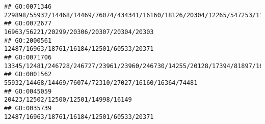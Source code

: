 \documentclass[
]{article}
\begin{document}
\begin{verbatim}
## GO:0071346                                                                                                                                                                                                                                                                                                                      229898/55932/14468/14469/76074/434341/16160/18126/20304/12265/547253/11629/15018/110558
## GO:0072677                                                                                                                                                                                                                                                                                                                                                                    16963/56221/20299/20306/20307/20304/20303
## GO:2000561                                                                                                                                                                                                                                                                                                                                                                    12487/16963/18761/16184/12501/60533/20371
## GO:0071706                                                                                                                                                                                                                                                                                        13345/12481/246728/246727/23961/23960/246730/14255/20128/17394/81897/16160/20303/12775/110168/12475/60533/20371/12229
## GO:0001562                                                                                                                                                                                                                                                                                                                                                        55932/14468/14469/76074/72310/27027/16160/16364/74481
## GO:0045059                                                                                                                                                                                                                                                                                                                                                                          20423/12502/12500/12501/14998/16149
## GO:0035739                                                                                                                                                                                                                                                                                                                                                                    12487/16963/18761/16184/12501/60533/20371

\end{verbatim}
\end{document}

